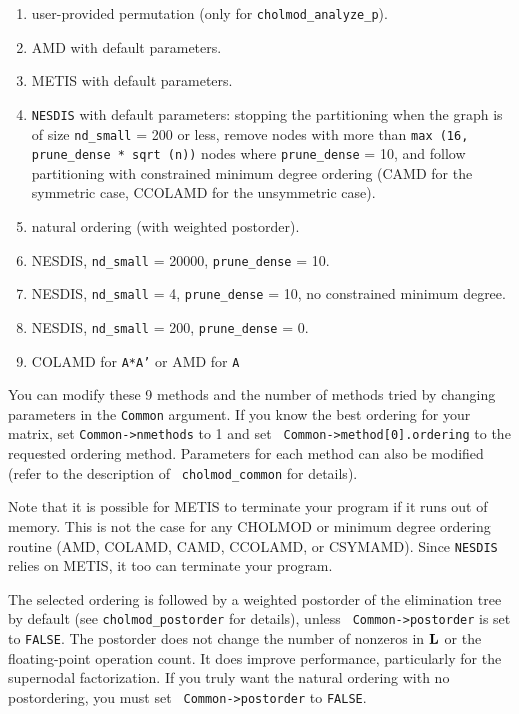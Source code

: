 \documentclass[11pt]{article}
\newcommand{\m}[1]{{\bf{#1}}}       %
\begin{document}
\begin{enumerate}
\item user-provided permutation (only for {\tt cholmod\_analyze\_p}).
\item AMD with default parameters.
\item METIS with default parameters.
\item {\tt NESDIS} with default parameters: stopping the partitioning when
            the graph is of size {\tt nd\_small} = 200 or less, remove nodes
            with more than {\tt max (16, prune\_dense * sqrt (n))} nodes where
            {\tt prune\_dense} = 10, and follow partitioning with constrained
            minimum degree ordering (CAMD for the symmetric case, CCOLAMD for
            the unsymmetric case).
\item natural ordering (with weighted postorder).
\item NESDIS, {\tt nd\_small} = 20000, {\tt prune\_dense} = 10.
\item NESDIS, {\tt nd\_small} =     4, {\tt prune\_dense} = 10,
    no constrained minimum degree.
\item NESDIS, {\tt nd\_small} =   200, {\tt prune\_dense} = 0.
\item COLAMD for {\tt A*A'} or AMD for {\tt A}
\end{enumerate}

You can modify these 9 methods and the number of methods tried by changing
parameters in the {\tt Common} argument.  If you know the best ordering for
your matrix, set {\tt Common->nmethods} to 1 and set {\tt
Common->method[0].ordering} to the requested ordering method.  Parameters for
each method can also be modified (refer to the description of {\tt
cholmod\_common} for details).

Note that it is possible for METIS to terminate your program if it runs out of
memory.  This is not the case for any CHOLMOD or minimum degree ordering
routine (AMD, COLAMD, CAMD, CCOLAMD, or CSYMAMD).  Since {\tt NESDIS} relies on
METIS, it too can terminate your program.

The selected ordering is followed by a weighted postorder of the elimination
tree by default (see {\tt cholmod\_postorder} for details), unless {\tt
Common->postorder} is set to {\tt FALSE}.  The postorder does not change the
number of nonzeros in $\m{L}$ or the floating-point operation count.  It does
improve performance, particularly for the supernodal factorization.  If you
truly want the natural ordering with no postordering, you must set {\tt
Common->postorder} to {\tt FALSE}.
\end{document}
